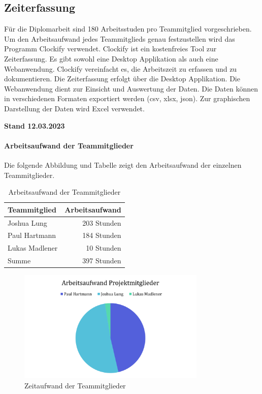 \subsection{Zeiterfassung}
Für die Diplomarbeit sind 180 Arbeitsstuden pro Teammitglied vorgeschrieben. Um den Arbeitsaufwand jedes Teammitglieds genau festzustellen wird das Programm Clockify verwendet. Clockify ist ein kostenfreies Tool zur Zeiterfassung. Es gibt sowohl eine Desktop Applikation als auch eine Webanwendung. Clockify vereinfacht es, die Arbeitszeit zu erfassen und zu dokumentieren. Die Zeiterfassung erfolgt über die Desktop Applikation. Die Webanwendung dient zur Einsicht und Auswertung der Daten. Die Daten können in verschiedenen Formaten exportiert werden (csv, xlsx, json). Zur graphischen Darstellung der Daten wird Excel verwendet.

\textbf{Stand 12.03.2023}

\paragraph{Arbeitsaufwand der Teammitglieder}
Die folgende Abbildung und Tabelle zeigt den Arbeitsaufwand der einzelnen Teammitglieder.

\begin{table}[H]
  \centering
  \begin{tabular}{lr}
    \toprule
    \textbf{Teammitglied} & \textbf{Arbeitsaufwand} \\
    \midrule
    Joshua Lung           & 203 Stunden             \\
    Paul Hartmann         & 184 Stunden             \\
    Lukas Madlener        & 10 Stunden              \\
    \midrule
    Summe                 & 397 Stunden             \\
    \bottomrule
  \end{tabular}
  \caption{Arbeitsaufwand der Teammitglieder}
  \label{tab:zeiterfassung_teammitglieder}
\end{table}

\begin{figure}[H]
  \centering
  \includegraphics[width=0.8\textwidth]{images/zeiterfassung_teammitglieder.png}
  \caption{Zeitaufwand der Teammitglieder}
  \label{fig:zeiterfassung_teammitglieder}
\end{figure}


